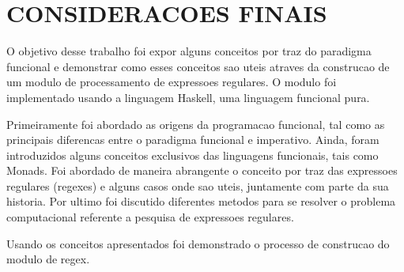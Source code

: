 \section{CONSIDERACOES FINAIS}

O objetivo desse trabalho foi expor alguns conceitos por traz do paradigma funcional e demonstrar como esses conceitos sao uteis atraves da construcao de um modulo de processamento de expressoes regulares.
O modulo foi implementado usando a linguagem Haskell, uma linguagem funcional pura.

Primeiramente foi abordado as origens da programacao funcional, tal como as principais diferencas entre o paradigma funcional e imperativo.
Ainda, foram introduzidos alguns conceitos exclusivos das linguagens funcionais, tais como Monads.
Foi abordado de maneira abrangente o conceito por traz das expressoes regulares (regexes) e alguns casos onde sao uteis, juntamente com parte da sua historia.
Por ultimo foi discutido diferentes metodos para se resolver o problema computacional referente a pesquisa de expressoes regulares.

Usando os conceitos apresentados foi demonstrado o processo de construcao do modulo de regex.



